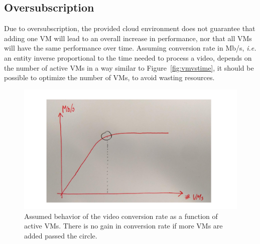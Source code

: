 \documentclass[a4paper, 10pt, english]{article}
\begin{document}
\subsection{Oversubscription}
Due to oversubscription, the provided cloud environment does not guarantee that adding one VM will lead to an overall increase in performance, nor that all VMs will have the same performance over time. Assuming conversion rate in Mb/s, \emph{i.e.} an entity inverse proportional to the time needed to process a video, depends on the number of active VMs in a way similar to Figure~\ref{fig:vmvstime}, it should be possible to optimize the number of VMs, to avoid wasting resources.
\begin{figure}
	\label{fig:vmvsMbs}
	\centering
	\includegraphics[width=.6\textwidth]{figs/vmvsMbs.pdf}
	\caption{Assumed behavior of the video conversion rate as a function of active VMs. There is no gain in conversion rate if more VMs are added passed the circle.}
\end{figure}
\end{document}
